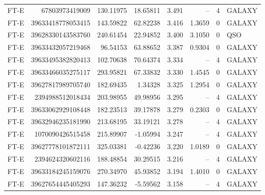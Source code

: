 \begin{ruledtabular}
\begin{tabular}{l r r r r r r l}
FT-E & 67803973419009 & 130.11975 & 18.65811 & 3.491 & -- & 4 & GALAXY \\
FT-E & 39633418778053415 & 143.59822 & 62.82238 & 3.416 & 1.3659 & 0 & GALAXY \\
FT-E & 39628330143583760 & 240.61454 & 22.94852 & 3.400 & 3.1050 & 0 & QSO \\
FT-E & 39633432057219468 & 96.54153 & 63.88652 & 3.387 & 0.9304 & 0 & GALAXY \\
FT-E & 39633495382820413 & 102.70638 & 70.64374 & 3.334 & -- & 4 & GALAXY \\
FT-E & 39633466035275117 & 293.95821 & 67.33832 & 3.330 & 1.4545 & 0 & GALAXY \\
FT-E & 39627817989705740 & 182.69435 & 1.34328 & 3.325 & 1.2954 & 0 & GALAXY \\
FT-E & 2394988512018434 & 203.98955 & 49.98956 & 3.295 & -- & 4 & GALAXY \\
FT-E & 39633062929108448 & 182.23513 & 39.17878 & 3.279 & 0.2303 & 0 & GALAXY \\
FT-E & 39632946235181990 & 213.68195 & 33.19121 & 3.278 & -- & 4 & GALAXY \\
FT-E & 1070090426515458 & 215.89907 & -1.05994 & 3.247 & -- & 4 & GALAXY \\
FT-E & 39627778101872111 & 325.03381 & -0.42236 & 3.220 & 1.0189 & 0 & GALAXY \\
FT-E & 2394624320602116 & 188.48854 & 30.29515 & 3.216 & -- & 4 & GALAXY \\
FT-E & 39633184245159076 & 270.34970 & 45.93852 & 3.194 & 1.4010 & 0 & GALAXY \\
FT-E & 39627654445405293 & 147.36232 & -5.59562 & 3.158 & -- & 4 & GALAXY \\
\end{tabular}
\end{ruledtabular}
